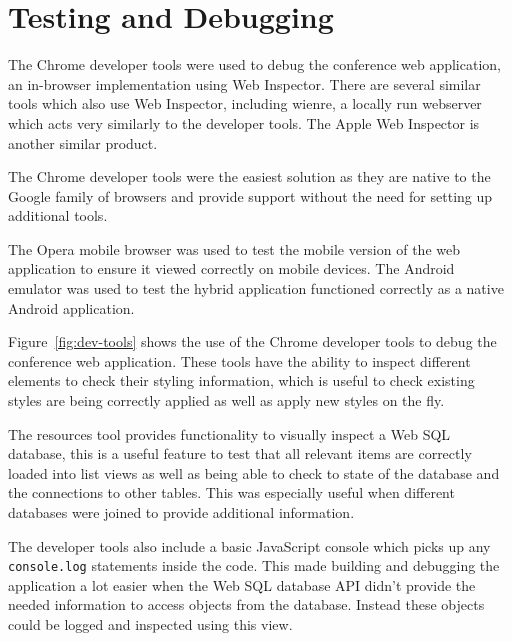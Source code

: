 \documentclass[11pt, a4paper]{article}
\begin{document}

\section{Testing and Debugging}
The Chrome developer tools were used to debug the conference web application,
an in-browser implementation using Web Inspector.%
There are several similar tools which also use Web Inspector, including wienre,
a locally run webserver which acts very similarly to the developer tools. The
Apple Web Inspector is another similar product.

The Chrome developer tools were the easiest solution as they are native to the
Google family of browsers and provide support without the need for setting up
additional tools.

The Opera mobile browser was used to test the mobile version of the web
application to ensure it viewed correctly on mobile devices. 
The Android emulator was used to test the hybrid application functioned
correctly as a native Android application.

Figure~\ref{fig:dev-tools} shows the use of the Chrome developer tools to debug
the conference web application. These tools have the ability to inspect
different elements to check their styling information, which is useful to check
existing styles are being correctly applied as well as apply new styles on the
fly.

The resources tool provides functionality to visually inspect a Web SQL
database, this is a useful feature to test that all relevant items are
correctly loaded into list views as well as being able to check to state of the
database and the connections to other tables. This was especially useful when
different databases were joined to provide additional information.

The developer tools also include a basic JavaScript console which picks up any
\texttt{console.log} statements inside the code. This made building and
debugging the application a lot easier when the Web SQL database API didn't
provide the needed information to access objects from the database. Instead
these objects could be logged and inspected using this view.
\end{document}
